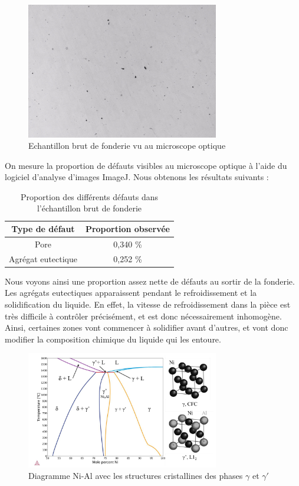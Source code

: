 \begin{figure}[htbp]
    \centering
    \includegraphics[width=0.75\textwidth]{images_optique/brut2.pdf}
    \caption{Echantillon brut de fonderie vu au microscope optique}
    \label{<label>}
\end{figure}

On mesure la proportion de défauts visibles au microscope optique à l'aide du 
logiciel d'analyse d'images ImageJ. Nous obtenons les résultats suivants : \\
\begin{table}
    \centering
    \caption{Proportion des différents défauts dans l'échantillon brut de fonderie}
    \begin{tabular}{c|c}
        \textbf{Type de défaut}  & \textbf{Proportion observée}  \\
        \hline
        Pore               & 0,340 \% \\
        Agrégat eutectique & 0,252 \% \\
    \end{tabular}

\end{table}

Nous voyons ainsi une proportion assez nette de défauts au sortir de la fonderie. 
Les agrégats eutectiques apparaissent pendant le refroidissement 
et la solidification du liquide. En effet, la vitesse de refroidissement dans 
la pièce est très difficile à contrôler précisément, et est donc nécessairement
inhomogène. Ainsi, certaines zones vont commencer à solidifier avant d'autres, et 
vont donc modifier la composition chimique du liquide qui les entoure. 


\begin{figure}[htbp]
    \centering
    \includegraphics[width=0.75\textwidth]{images/diagramme_phase.png}
    \caption{Diagramme Ni-Al avec les structures cristallines des phases $\gamma$ et $\gamma'$}
    \label{<label>}
\end{figure}

